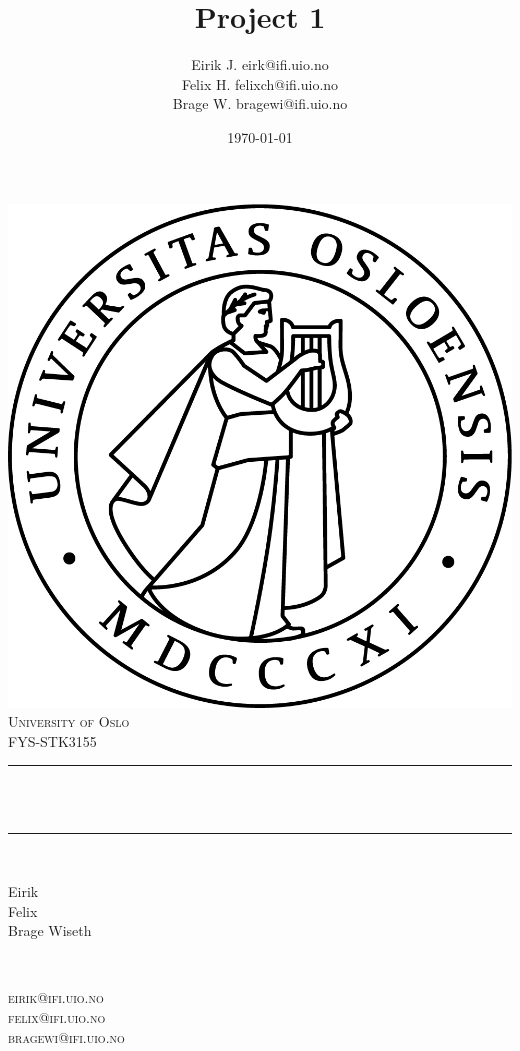 \documentclass[twoside,11pt]{report}
\title{{\huge Project 1}}
\author{\name Eirik J. \email eirk@ifi.uio.no \\
       \name Felix H.  \email felixch@ifi.uio.no \\
       \name Brage W. \email bragewi@ifi.uio.no}
\date{\today}											%
\begin{document}

\begin{titlepage}
	\centering
    \vspace*{0.5 cm}
    \includegraphics[scale = 0.75]{uio.jpg}\\[1.0 cm]	%
    \textsc{\LARGE University of Oslo}\\[2.0 cm]	    %
	\textsc{\Large FYS-STK3155}\\[0.5 cm]				%
	\rule{\linewidth}{0.2 mm} \\[0.4 cm]
	{ \huge \bfseries \@title}\\
	\rule{\linewidth}{0.2 mm} \\[1.5 cm]

	\begin{minipage}{0.4\textwidth}
		\begin{flushleft} \normalsize
			Eirik\\
            Felix\\
            Brage Wiseth\\
			\end{flushleft}
			\end{minipage}~
			\begin{minipage}{0.4\textwidth}
			\begin{flushright} \normalsize
        \textsc{
		  eirik@ifi.uio.no\\
          felix@ifi.uio.no\\
          bragewi@ifi.uio.no\\
        }
		\end{flushright}
        

\end{minipage}
\end{titlepage}
\end{document}
